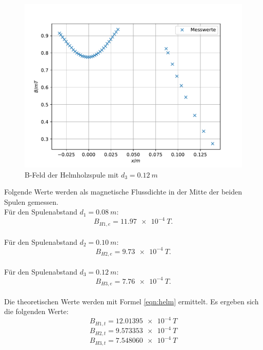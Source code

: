 
\begin{figure}[h!]
  \centering
  \includegraphics[width=\textwidth]{Helm12.pdf}
  \caption{B-Feld der Helmholzspule mit $d_{3}=\SI{0.12}{m}$}
  \label{fig:h12}
\end{figure}

Folgende Werte werden als magnetische Flussdichte in der Mitte der beiden Spulen gemessen.
\\Für den Spulenabstand $d_{1}=\SI{0.08}{m}$:
\begin{equation*}
  B_{H1, e} = \SI{11.97e-4}{T}.
\end{equation*}
\\Für den Spulenabstand $d_{2}=\SI{0.10}{m}$:
\begin{equation*}
  B_{H2, e} = \SI{9.73e-4}{T}.
\end{equation*}
\\Für den Spulenabstand $d_{3}=\SI{0.12}{m}$:
\begin{equation*}
  B_{H3, e} = \SI{7.76e-4}{T}.
\end{equation*}
\\Die theoretischen Werte werden mit Formel \eqref{eqn:helm} ermittelt.
Es ergeben sich die folgenden Werte:
\begin{equation*}
  B_{H1, t} = \SI{12.01395e-4}{T}
\end{equation*}
\begin{equation*}
  B_{H2, t} = \SI{9.573353e-4}{T}
\end{equation*}
\begin{equation*}
  B_{H3, t} = \SI{7.548060e-4}{T}
\end{equation*}
\FloatBarrier


